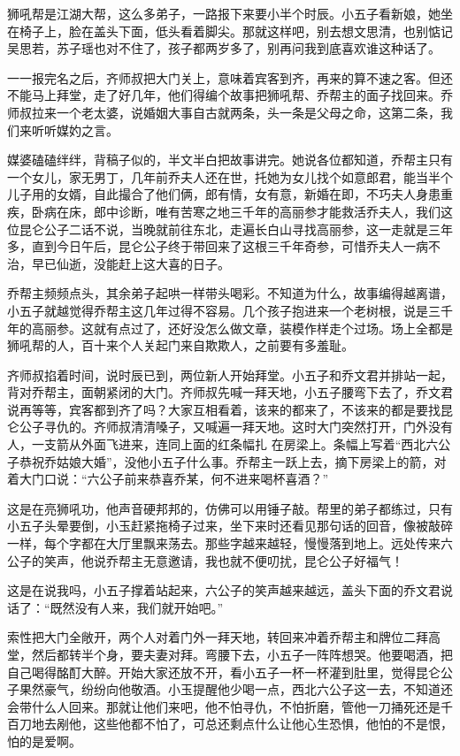 狮吼帮是江湖大帮，这么多弟子，一路报下来要小半个时辰。小五子看新娘，她坐在椅子上，脸在盖头下面，低头看着脚尖。那就这样吧，别去想文思清，也别惦记吴思若，苏子瑶也对不住了，孩子都两岁多了，别再问我到底喜欢谁这种话了。

一一报完名之后，齐师叔把大门关上，意味着宾客到齐，再来的算不速之客。但还不能马上拜堂，走了好几年，他们得编个故事把狮吼帮、乔帮主的面子找回来。乔师叔拉来一个老太婆，说婚姻大事自古就两条，头一条是父母之命，这第二条，我们来听听媒妁之言。

媒婆磕磕绊绊，背稿子似的，半文半白把故事讲完。她说各位都知道，乔帮主只有一个女儿，家无男丁，几年前乔夫人还在世，托她为女儿找个如意郎君，能当半个儿子用的女婿，自此撮合了他们俩，郎有情，女有意，新婚在即，不巧夫人身患重疾，卧病在床，郎中诊断，唯有苦寒之地三千年的高丽参才能救活乔夫人，我们这位昆仑公子二话不说，当晚就前往东北，走遍长白山寻找高丽参，这一走就是三年多，直到今日午后，昆仑公子终于带回来了这根三千年奇参，可惜乔夫人一病不治，早已仙逝，没能赶上这大喜的日子。

乔帮主频频点头，其余弟子起哄一样带头喝彩。不知道为什么，故事编得越离谱，小五子就越觉得乔帮主这几年过得不容易。几个孩子抱进来一个老树根，说是三千年的高丽参。这就有点过了，还好没怎么做文章，装模作样走个过场。场上全都是狮吼帮的人，百十来个人关起门来自欺欺人，之前要有多羞耻。

齐师叔掐着时间，说时辰已到，两位新人开始拜堂。小五子和乔文君并排站一起，背对乔帮主，面朝紧闭的大门。齐师叔先喊一拜天地，小五子腰弯下去了，乔文君说再等等，宾客都到齐了吗？大家互相看着，该来的都来了，不该来的都是要找昆仑公子寻仇的。齐师叔清清嗓子，又喊遍一拜天地。这时大门突然打开，门外没有人，一支箭从外面飞进来，连同上面的红条幅扎
在房梁上。条幅上写着“西北六公子恭祝乔姑娘大婚”，没他小五子什么事。乔帮主一跃上去，摘下房梁上的箭，对着大门口说：“六公子前来恭喜乔某，何不进来喝杯喜酒？”

这是在亮狮吼功，他声音硬邦邦的，仿佛可以用锤子敲。帮里的弟子都练过，只有小五子头晕要倒，小玉赶紧拖椅子过来，坐下来时还看见那句话的回音，像被敲碎一样，每个字都在大厅里飘来荡去。那些字越来越轻，慢慢落到地上。远处传来六公子的笑声，他说乔帮主无意邀请，我也就不便叨扰，昆仑公子好福气！

这是在说我吗，小五子撑着站起来，六公子的笑声越来越远，盖头下面的乔文君说话了：“既然没有人来，我们就开始吧。”

索性把大门全敞开，两个人对着门外一拜天地，转回来冲着乔帮主和牌位二拜高堂，然后都转半个身，要夫妻对拜。弯腰下去，小五子一阵阵想哭。他要喝酒，把自己喝得酩酊大醉。开始大家还放不开，看小五子一杯一杯灌到肚里，觉得昆仑公子果然豪气，纷纷向他敬酒。小玉提醒他少喝一点，西北六公子这一去，不知道还会带什么人回来。那就让他们来吧，他不怕寻仇，不怕折磨，管他一刀捅死还是千百刀地去剐他，这些他都不怕了，可总还剩点什么让他心生恐惧，他怕的不是恨，怕的是爱啊。


